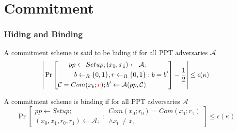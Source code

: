 \documentclass[UFT8]{beamer}
\begin{document}
\section{{Commitment}}

\begin{frame}
    \frametitle{Hiding and Binding}
	\begin{definition}
		A commitment scheme is said to be hiding if for all PPT adversaries $\mathcal{A}$
		\begin{equation*}
			\left\lvert \Pr\left[
				\begin{aligned}
					pp \leftarrow Setup; (x_0, x_1) \leftarrow \mathcal{A}; \\
					b \leftarrow_R \{0, 1\}, r \leftarrow_R \{0, 1\} \\
					\mathcal{C} = Com(x_b; {\color{red}r});
					b' \leftarrow \mathcal{A}(pp, \mathcal{C}) 
				\end{aligned}: b = b'
			\right] - \frac{1}{2} \right\rvert \le \epsilon(\kappa)
		\end{equation*}
	\end{definition}

	\begin{definition}
		A commitment scheme is binding if for all PPT adversaries $\mathcal{A}$
		\begin{equation*}
			\Pr\left[
				\begin{aligned}
					pp \leftarrow Setup;\\
					(x_0, x_1, r_0, r_1) \leftarrow \mathcal{A};
				\end{aligned}: \begin{aligned}
					Com(x_0; r_0) = Com(x_1; r_1) \\
					\land x_0 \neq x_1
				\end{aligned}
			\right] \le \epsilon(\kappa)
		\end{equation*}
	\end{definition}
\end{frame}
\end{document}
